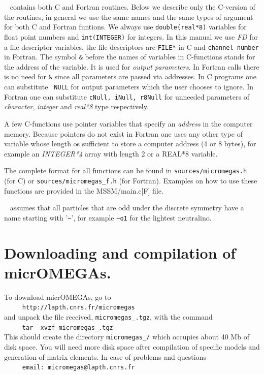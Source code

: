 \documentclass[12pt,a4paper]{article}
\begin{document}
\micro~ contains both C and Fortran routines. Below we describe only the
C-version of the routines,  in general we use the same  names
 and the same types of argument for both  C and Fortran funtions. 
We always use \verb|double(real*8)| variables for float point numbers and 
\verb|int(INTEGER)| for integers. In this manual we use {\it FD} for a file descriptor 
variables, the file descriptors  are  \verb|FILE*| in C and {\tt channel number} in Fortran. 
The symbol \verb|&| before the names of variables in C-functions stands for 
the address of the variable. It is used for  {\it output
parameters}. In Fortran calls there is no need for \verb|&|
since  all parameters are passed via addresses. In C programs one  can substitute {\tt
NULL} for output parameters which the user chooses to ignore. In Fortran  one
can substitute {\tt cNull, iNull, r8Null} for unneeded
parameters of  {\it character}, {\it integer}  and {\it real*8}  type respectively.  

A few C-functions use pointer variables that specify an {\it address} in 
the computer memory. Because pointers do not exist in  Fortran one uses any
other type of variable whose length os sufficient to store a computer address 
(4 or 8 bytes), for example an {\it INTEGER*4} array with length 2 or 
a {REAL*8} variable. 

The complete format  for all functions can be found in
\verb|sources/micromegas.h| (for C) or
\verb|sources/micromegas_f.h| (for Fortran). Examples on how to use these functions are provided   
in the MSSM/main.c[F] file. 
 
 
 \micro~ assumes that all particles that are odd under the discrete symmetry have
 a name starting with '\verb|~|', for example \verb|~o1| for the lightest  neutralino.



\section {Downloading and compilation of micrOMEGAs.}
To   download  micrOMEGAs, go to    \\  
\verb|     http://lapth.cnrs.fr/micromegas|\\
and unpack the file received, \verb|micromegas_|\VERSION\verb|.tgz|, with the command\\
\verb|     tar -xvzf micromegas_|\VERSION\verb|.tgz|\\
This should create the directory \verb|micromegas_|\VERSION\verb|/| which occupies about 40
Mb of disk space. You will need more disk space after compilation of
specific models and generation of matrix elements.
In case of problems and questions\\
\verb|     email: micromegas@lapth.cnrs.fr|\\
\end{document}
